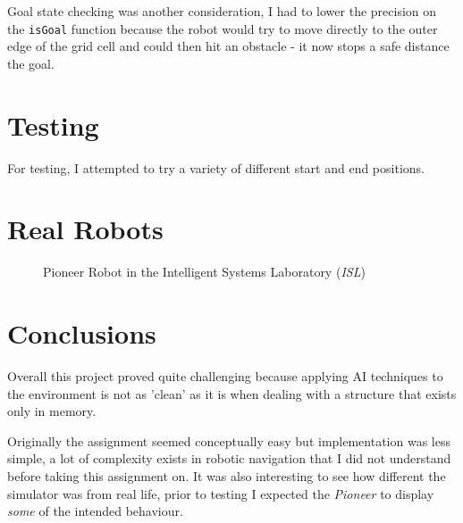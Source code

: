 \documentclass[a4paper,12pt]{article}
\begin{document}
Goal state checking was another consideration, I had to lower the precision on the \texttt{isGoal} function because the robot would try to move directly to the outer edge of the grid cell and could then hit an obstacle - it now stops a safe distance the goal.
\section{Testing}
For testing, I attempted to try a variety of different start and end positions. 
\newpage
\section{Real Robots}
\begin{figure}[h!]
\begin{center}
    \caption{Pioneer Robot in the Intelligent Systems Laboratory (\textit{ISL})}
\end{center}
\end{figure}
\section{Conclusions}
Overall this project proved quite challenging because applying AI techniques to the environment is not as 'clean' as it is when dealing with a structure that exists only in memory. 

Originally the assignment seemed conceptually easy but implementation was less simple, a lot of complexity exists in robotic navigation that I did not understand before taking this assignment on. It was also interesting to see how different the simulator was from real life, prior to testing I expected the \textit{Pioneer} to display \textit{some} of the intended behaviour.
\end{document}
